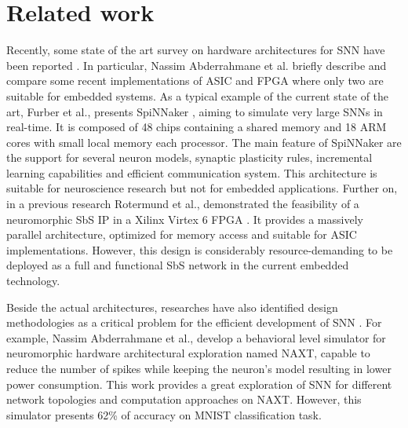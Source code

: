 \section{Related work}
\label{sec:related_work}
Recently, some state of the art survey on hardware architectures for SNN have been reported \cite{Design_Exploration_SbS_Trans20, SNN_Survey_Trans19}. In particular, Nassim Abderrahmane et al. briefly describe and compare some recent implementations of ASIC and FPGA where only two are suitable for embedded systems. As a typical example of the current state of the art, Furber et al., presents SpiNNaker \cite{Spinnaker_Trans13}, aiming to simulate very large SNNs in real-time. It is composed of 48 chips containing a shared memory and 18 ARM cores with small local memory each processor. The main feature of SpiNNaker are the support for several neuron models, synaptic plasticity rules, incremental learning capabilities and efficient communication system. This architecture is suitable for neuroscience research but not for embedded applications. Further on, in a previous research Rotermund et al., demonstrated the feasibility of a neuromorphic SbS IP in a Xilinx Virtex 6 FPGA \cite{rotermund2018massively}. It provides a massively parallel architecture, optimized for memory access and suitable for ASIC implementations. However, this design is considerably resource-demanding to be deployed as a full and functional SbS network in the current embedded technology.

Beside the actual architectures, researches have also identified design methodologies as a critical problem for the efficient development of SNN \cite{Design_Exploration_SbS_Trans20}. For example, Nassim Abderrahmane et al., develop a behavioral level simulator for neuromorphic hardware architectural exploration named NAXT, capable to reduce the number of spikes while keeping the neuron's model resulting in lower power consumption. This work provides a great exploration of SNN for different network topologies and computation approaches on NAXT. However, this simulator presents 62\% of accuracy on MNIST classification task.
